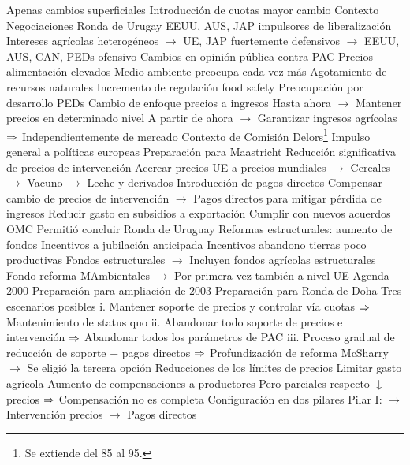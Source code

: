 \documentclass{nuevotema}
\begin{document}
\begin{esquemal}
				\4[] Apenas cambios superficiales
				\4[] Introducción de cuotas mayor cambio
				\4 Contexto
				\4[] Negociaciones Ronda de Urugay
				\4[] EEUU, AUS, JAP impulsores de liberalización
				\4[] Intereses agrícolas heterogéneos
				\4[] $\to$ UE, JAP fuertemente defensivos
				\4[] $\to$ EEUU, AUS, CAN, PEDs ofensivo
				\4 Cambios en opinión pública contra PAC
				\4[] Precios alimentación elevados
				\4[] Medio ambiente preocupa cada vez más
				\4[] Agotamiento de recursos naturales
				\4[] Incremento de regulación food safety
				\4[] Preocupación por desarrollo PEDs
				\4 Cambio de enfoque precios a ingresos
				\4[] Hasta ahora
				\4[] $\to$ Mantener precios en determinado nivel
				\4[] A partir de ahora
				\4[] $\to$ Garantizar ingresos agrícolas
				\4[] $\Rightarrow$ Independientemente de mercado
				\4 Contexto de Comisión Delors\footnote{Se extiende del 85 al 95.}
				\4[] Impulso general a políticas europeas
				\4[] Preparación para Maastricht
				\4 Reducción significativa de precios de intervención
				\4[] Acercar precios UE a precios mundiales
				\4[] $\to$ Cereales
				\4[] $\to$ Vacuno
				\4[] $\to$ Leche y derivados
				\4 Introducción de pagos directos
				\4[] Compensar cambio de precios de intervención
				\4[] $\to$ Pagos directos para mitigar pérdida de ingresos
				\4 Reducir gasto en subsidios a exportación
				\4[] Cumplir con nuevos acuerdos OMC
				\4 Permitió concluir Ronda de Uruguay
				\4 Reformas estructurales: aumento de fondos
				\4[] Incentivos a jubilación anticipada
				\4[] Incentivos abandono tierras poco productivas
				\4[] Fondos estructurales
				\4[] $\to$ Incluyen fondos agrícolas estructurales
				\4[] Fondo reforma MAmbientales
				\4[] $\to$ Por primera vez también a nivel UE
			\3 Agenda 2000
				\4 Preparación para ampliación de 2003
				\4 Preparación para Ronda de Doha
				\4 Tres escenarios posibles
				\4[] i. Mantener soporte de precios y controlar vía cuotas
				\4[] $\Rightarrow$ Mantenimiento de status quo
				\4[] ii. Abandonar todo soporte de precios e intervención
				\4[] $\Rightarrow$ Abandonar todos los parámetros de PAC
				\4[] iii. Proceso gradual de reducción de soporte + pagos directos
				\4[] $\Rightarrow$ Profundización de reforma McSharry
				\4[] $\to$ Se eligió la tercera opción
				\4 Reducciones de los límites de precios
				\4[] Limitar gasto agrícola
				\4 Aumento de compensaciones a productores
				\4[] Pero parciales respecto $\downarrow$ precios
				\4[] $\Rightarrow$ Compensación no es completa
				\4 Configuración en dos pilares
				\4[] Pilar I:
				\4[] $\to$ Intervención precios
				\4[] $\to$ Pagos directos

\end{esquemal}
\end{document}
